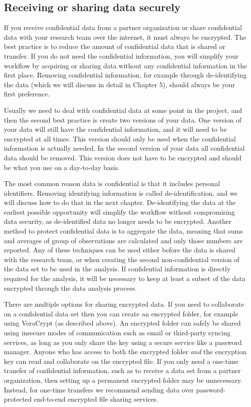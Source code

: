 \subsection{Receiving or sharing data securely}

If you receive confidential data from a partner organization
or share confidential data with your research team over the internet,
it must always be encrypted.
The best practice is to reduce the amount of confidential data
that is shared or transfer.
If you do not need the confidential information, you will simplify your workflow
by acquiring or sharing data without any confidential information in the first place.
Removing confidential information, for example through de-identifying the data
(which we will discuss in detail in Chapter 5), should always be your first preference.

Usually we need to deal with confidential data at some point in the project,
and then the second best practice is create two versions of your data.
One version of your data will still have the confidential information,
and it will need to be encrypted at all times.
This version should only be used when the confidential information is actually needed.
In the second version of your data all confidential data should be removed.
This version does not have to be encrypted
and should be what you use on a day-to-day basis.

The most common reason data is confidential is that it includes personal identifiers.
Removing identifying information is called de-identification,
and we will discuss how to do that in the next chapter.
De-identifying the data at the earliest possible opportunity
will simplify the workflow without compromising data security,
as de-identified data no longer needs to be encrypted.
Another method to protect confidential data is to aggregate the data,
meaning that sums and averages of group of observations are calculated
and only those numbers are reported.
Any of these techniques can be used either before the data is shared with the research team,
or when creating the second non-confidential version of the data set to be used in the analysis.
If confidential information is directly required for the analysis,
it will be necessary to keep at least a subset of the data encrypted through the data analysis process.

There are multiple options for sharing encrypted data.
If you need to collaborate on a confidential data set
then you can create an encrypted folder, for example using VeraCrypt (as described above).
An encrypted folder can safely be shared using insecure modes of communication
such as email or third-party syncing services,
as long as you only share the key
using a secure service like a password manager.
Anyone who has access to both the encrypted folder \textit{and} the encryption key
can read and collaborate on the encrypted file.
If you only need a one-time transfer of confidential information,
such as to receive a data set from a partner organization,
then setting up a permanent encrypted folder may be unnecessary.
Instead, for one-time transfers we recommend sending data over password-protected
end-to-end encrypted file sharing services.

